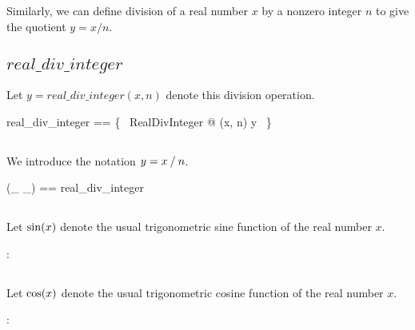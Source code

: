 \documentclass[11pt, oneside]{article}
\begin{document}
Similarly, we can define division of a real number $x$ by a nonzero integer $n$
to give the quotient $y = x / n$.


\subsection{$real\_div\_integer$}

Let $y = real\_div\_integer(x, n)$ denote this division operation.

\begin{zed}
	real\_div\_integer == \{~ RealDivInteger @ (x, n) \mapsto y ~\}
\end{zed}

\subsection{}

We introduce the notation $y = x \mathbin{/} n$.

\begin{zed}
	(\_ \divRZ \_) == real\_div\_integer
\end{zed}

\subsection{}

Let $\operatorname{sin}(x)$ denote the usual trigonometric sine function of the real number $x$.

\begin{axdef}
	\sinR : \R \fun \R
\end{axdef}

\subsection{}

Let $\operatorname{cos}(x)$ denote the usual trigonometric cosine function of the real number $x$.

\begin{axdef}
	\cosR : \R \fun \R
\end{axdef}

\subsection{}
\end{document}
